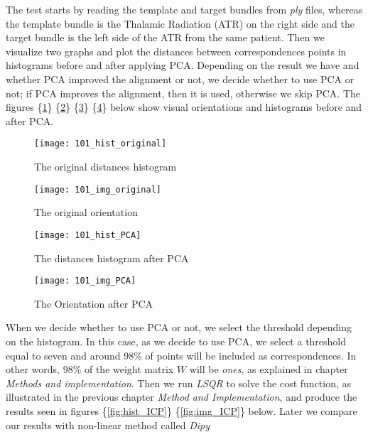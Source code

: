 \documentclass[../structure.tex]{subfiles}
\begin{document}
The test starts by reading the template and target bundles from \textit{ply} files, whereas the template bundle is the Thalamic Radiation (ATR) on the right side and the target bundle is the left side of the ATR from the same patient. Then we visualize two graphs and plot the distances between correspondences points in histograms before and after applying PCA. Depending on the result we have and whether PCA improved the alignment or not, we decide whether to use PCA or not; if PCA improves the alignment, then it is used, otherwise we skip PCA. The figures \{\ref{fig:hist_original}\} \{\ref{fig:img_original}\} \{\ref{fig:hist_PCA}\} \{\ref{fig:img_PCA}\} below show visual orientations and histograms before and after PCA.

\begin{figure}[h!]
\centering
\texttt{[image: 101\_hist\_original]}
\captionsetup{justification=centering}
\caption{The original distances histogram}
\label{fig:hist_original}
\end{figure}

\begin{figure}[h!]
\centering
\texttt{[image: 101\_img\_original]}
\captionsetup{justification=centering}
\caption{The original orientation}
\label{fig:img_original}
\end{figure}
\pagebreak
\begin{figure}[h!]
\centering
\texttt{[image: 101\_hist\_PCA]}
\captionsetup{justification=centering}
\caption{The distances histogram after PCA}
\label{fig:hist_PCA}
\end{figure}

\begin{figure}[h!]
\centering
\texttt{[image: 101\_img\_PCA]}
\captionsetup{justification=centering}
\caption{The Orientation after PCA}
\label{fig:img_PCA}
\end{figure}
\pagebreak
When we decide whether to use PCA or not, we select the threshold depending on the histogram. In this case, as we decide to use PCA, we select a threshold equal to seven and around 98\% of points will be included as correspondences. In other words, 98\% of the weight matrix $W$ will be \textit{ones}, as explained in chapter \textit{Methods and implementation}. Then we run \textit{LSQR} to solve the cost function, as illustrated in the previous chapter \textit{Method and Implementation}, and produce the results seen in figures \{\ref{fig:hist_ICP}\} \{\ref{fig:img_ICP}\} below. Later we compare our results with non-linear method called \textit{Dipy} 
\end{document}
